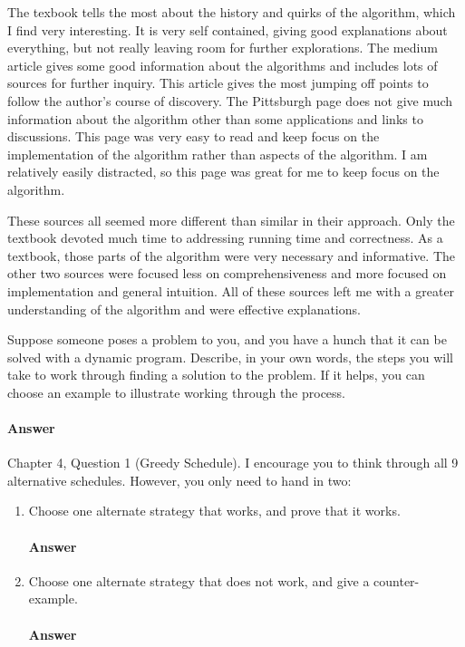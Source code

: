 \documentclass{article}
\begin{document}
The texbook tells the most about the history and quirks of the algorithm, which I
find very interesting. It is very self contained, giving good explanations about
everything, but not really leaving room for further explorations. The medium article
gives some good information about the algorithms and includes lots of sources
for further inquiry. This article gives the most jumping off points to follow the
author's course of discovery. The Pittsburgh page does not give much information
about the algorithm other than some applications and links to discussions. This
page was very easy to read and keep focus on the implementation of the algorithm
rather than aspects of the algorithm. I am relatively easily distracted, so this
page was great for me to keep focus on the algorithm.

These sources all seemed more different than similar in their approach. Only the
textbook devoted much time to addressing running time and correctness. As a textbook,
those parts of the algorithm were very necessary and informative. The other two
sources were focused less on comprehensiveness and more focused on implementation
and general intuition. All of these sources left me with a greater
understanding of the algorithm and were effective explanations.

\collab{\todo{}}

Suppose someone poses a problem to you, and you have a hunch that it can be
solved with a dynamic program.  Describe, in your own words, the steps you will
take to work through finding a solution to the problem.  If it helps, you can
choose an example to illustrate working through the process.

\paragraph{Answer}
\todo{}


\collab{\todo{}}

Chapter 4, Question 1 (Greedy Schedule).  I encourage you to think through all 9
alternative schedules.  However, you only need to hand in two:
\begin{enumerate}
    \item Choose one alternate strategy that
        works, and prove that it works.

    \paragraph{Answer}
    \todo{}

    \item Choose one alternate strategy that does not work, and give a
        counter-example.

    \paragraph{Answer}
    \todo{}

\end{enumerate}
\end{document}
